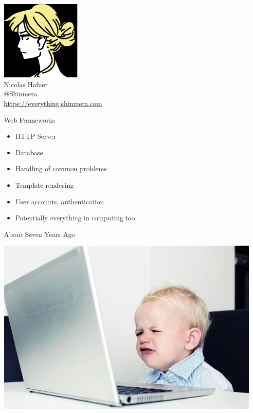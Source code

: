 \documentclass[14pt]{beamer}
\newcommand{\toptitle}[1]{
  {\huge #1} \\
  \vspace{0.2cm}
}
\begin{document}
\begin{frame}
  \begin{center}
    \includegraphics[height=4cm]{avatar.png}\\
    \vspace{0.2cm}
    {\Large Nicolas Hafner} \\
    \vspace{0.2cm}
    {\LARGE @Shinmera} \\
    \vspace{0.2cm}
    \url{https://everything.shinmera.com}
  \end{center}
\end{frame}

\begin{frame}
  \toptitle{Web Frameworks}
  \begin{itemize}
  \item HTTP Server
  \item Database
  \item Handling of common problems
  \item Template rendering
  \item User accounts, authentication
    \pause
  \item Potentially everything in computing too
  \end{itemize}
\end{frame}

\begin{frame}
  \toptitle{About Seven Years Ago}
  \begin{center}
    \includegraphics[width=0.8\pagewidth]{baby-at-computer.jpg}
  \end{center}
\end{frame}
\end{document}
